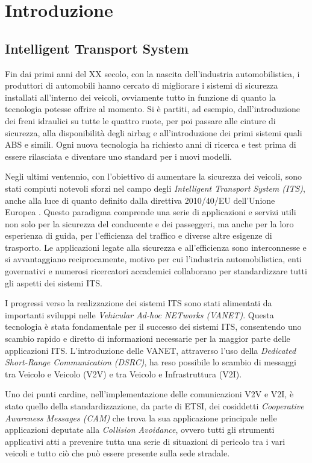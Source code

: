 \chapter{Introduzione}

\section{Intelligent Transport System}
Fin dai primi anni del XX secolo, con la nascita dell'industria automobilistica, i produttori di automobili hanno cercato di migliorare i sistemi di sicurezza installati all'interno dei veicoli, ovviamente tutto in funzione di quanto la tecnologia potesse offrire al momento. Si è partiti, ad esempio, dall'introduzione dei freni idraulici su tutte le quattro ruote, per poi passare alle cinture di sicurezza, alla disponibilità degli airbag e all'introduzione dei primi sistemi quali ABS e simili. Ogni nuova tecnologia ha richiesto anni di ricerca e test prima di essere rilasciata e diventare uno standard per i nuovi modelli.

Negli ultimi ventennio, con l'obiettivo di aumentare la sicurezza dei veicoli, sono stati compiuti notevoli sforzi nel campo degli \textit{Intelligent Transport System (ITS)}, anche alla luce di quanto definito dalla direttiva 2010/40/EU dell'Unione Europea \cite{2010-40}. Questo paradigma comprende una serie di applicazioni e servizi utili non solo per la sicurezza del conducente e dei passeggeri, ma anche per la loro esperienza di guida, per l'efficienza del traffico e diverse altre esigenze di trasporto. Le applicazioni legate alla sicurezza e all'efficienza sono interconnesse e si avvantaggiano reciprocamente, motivo per cui l'industria automobilistica, enti governativi e numerosi ricercatori accademici collaborano per standardizzare tutti gli aspetti dei sistemi ITS.

I progressi verso la realizzazione dei sistemi ITS sono stati alimentati da importanti sviluppi nelle \textit{Vehicular Ad-hoc NETworks (VANET)}. Questa tecnologia è stata fondamentale per il successo dei sistemi ITS, consentendo uno scambio rapido e diretto di informazioni necessarie per la maggior parte delle applicazioni ITS. L'introduzione delle VANET, attraverso l'uso della \textit{Dedicated Short-Range Communication (DSRC)}, ha reso possibile lo scambio di messaggi tra Veicolo e Veicolo (V2V) e tra Veicolo e Infrastruttura (V2I).

Uno dei punti cardine, nell'implementazione delle comunicazioni V2V e V2I, è stato quello della standardizzazione, da parte di ETSI, dei cosiddetti \textit{Cooperative Awareness Messages (CAM)} che trova la sua applicazione principale nelle applicazioni deputate alla \textit{Collision Avoidance}, ovvero tutti gli strumenti applicativi atti a prevenire tutta una serie di situazioni di pericolo tra i vari veicoli e tutto ciò che può essere presente sulla sede stradale.

